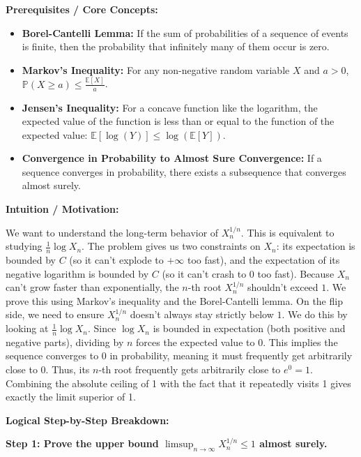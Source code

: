\begin{solution}
\textbf{Prerequisites / Core Concepts:}
\begin{itemize}
    \item \textbf{Borel-Cantelli Lemma:} If the sum of probabilities of a sequence of events is finite, then the probability that infinitely many of them occur is zero.
    \item \textbf{Markov's Inequality:} For any non-negative random variable $X$ and $a > 0$, $\mathbb{P}(X \geq a) \leq \frac{\mathbb{E}[X]}{a}$.
    \item \textbf{Jensen's Inequality:} For a concave function like the logarithm, the expected value of the function is less than or equal to the function of the expected value: $\mathbb{E}[\log(Y)] \leq \log(\mathbb{E}[Y])$.
    \item \textbf{Convergence in Probability to Almost Sure Convergence:} If a sequence converges in probability, there exists a subsequence that converges almost surely.
\end{itemize}

\textbf{Intuition / Motivation:}

We want to understand the long-term behavior of $X_n^{1/n}$. This is equivalent to studying $\frac{1}{n} \log X_n$.
The problem gives us two constraints on $X_n$: its expectation is bounded by $C$ (so it can't explode to $+\infty$ too fast), and the expectation of its negative logarithm is bounded by $C$ (so it can't crash to $0$ too fast).
Because $X_n$ can't grow faster than exponentially, the $n$-th root $X_n^{1/n}$ shouldn't exceed $1$. We prove this using Markov's inequality and the Borel-Cantelli lemma. 
On the flip side, we need to ensure $X_n^{1/n}$ doesn't always stay strictly below $1$. We do this by looking at $\frac{1}{n} \log X_n$. Since $\log X_n$ is bounded in expectation (both positive and negative parts), dividing by $n$ forces the expected value to 0. This implies the sequence converges to 0 in probability, meaning it must frequently get arbitrarily close to 0. Thus, its $n$-th root frequently gets arbitrarily close to $e^0 = 1$. Combining the absolute ceiling of 1 with the fact that it repeatedly visits 1 gives exactly the limit superior of 1.

\textbf{Logical Step-by-Step Breakdown:}

\textbf{Step 1: Prove the upper bound $\limsup_{n \to \infty} X_n^{1/n} \leq 1$ almost surely.}


\end{solution}
